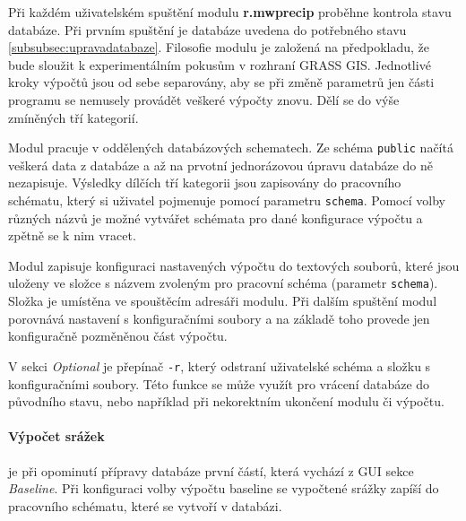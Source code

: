 \documentclass[a4paper,12pt]{report}
\begin{document}
Při každém uživatelském spuštění modulu \textbf{r.mwprecip } proběhne kontrola stavu databáze. Při prvním spuštění je databáze uvedena do potřebného stavu \ref{subsubsec:upravadatabaze}. Filosofie modulu je založená na předpokladu, že bude sloužit k experimentálním pokusům v rozhraní GRASS GIS. Jednotlivé kroky výpočtů jsou od sebe separovány, aby se při změně parametrů jen části programu se nemusely provádět veškeré výpočty znovu. Dělí se do výše zmíněných tří kategorií. 

Modul pracuje v oddělených databázových schematech. Ze schéma \texttt{public} načítá veškerá data z databáze a až na prvotní jednorázovou úpravu databáze do ně nezapisuje. Výsledky dílčích tří kategorii jsou zapisovány do pracovního schématu, který si uživatel pojmenuje pomocí parametru \texttt{schema}. Pomocí volby různých názvů je možné vytvářet schémata pro dané konfigurace výpočtu a zpětně se k nim vracet.

Modul zapisuje konfiguraci nastavených výpočtu do textových souborů, které jsou uloženy ve složce s názvem zvoleným pro pracovní schéma (parametr \texttt{schema}). Složka je umístěna ve spouštěcím adresáři modulu. Při dalším spuštění modul porovnává nastavení s konfiguračními soubory a na základě toho provede jen konfiguračně pozměněnou část výpočtu. 

V sekci \textit{Optional} je přepínač \texttt{-r}, který odstraní uživatelské schéma a složku s konfiguračními soubory. Této funkce se může využít pro vrácení databáze do původního stavu, nebo například při nekorektním ukončení modulu či výpočtu.


\paragraph*{Výpočet srážek} je při opominutí přípravy databáze první částí, která vychází z \acs{GUI} sekce \textit{Baseline}. Při konfiguraci volby výpočtu baseline se vypočtené srážky zapíší do pracovního schématu, které se vytvoří v databázi.
\end{document}
